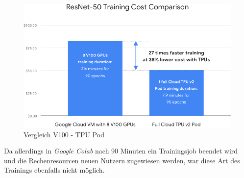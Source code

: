 \begin{figure}[ht]
	\begin{center}
		\includegraphics[width=14cm]{Bilder/tpu_comparison.png} 
		\caption[Vergleich V100 - TPU Pod]{Vergleich V100 - TPU Pod \cite{GoogleCloud.20200209b}}
		\label{tpu}
	\end{center}
\end{figure}

Da allerdings in \textit{Google Colab} nach 90 Minuten ein Trainingsjob beendet wird und die Rechenresourcen neuen Nutzern zugewiesen werden, war diese Art des Trainings ebenfalls nicht möglich. 
